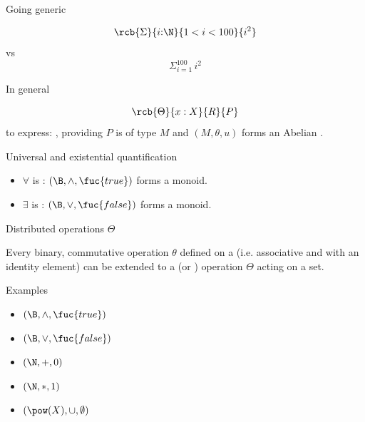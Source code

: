 \documentclass{beamer}
\def\true{\fuc{true}}
\def\false{\fuc{false}}
\def\e{\mathbin{\wedge}}
\def\ou{\mathbin{\vee}}
\begin{document}
\begin{slide}{Going generic}

$$
\rcb{\Sigma}{i{:}\N}{1<i<100}{i^2}
$$
vs 
$$\Sigma_{i=1}^{100} \, i^2$$

\begin{block}{In general}

$$
\rcb{\Theta}{x:X}{R}{P}
$$
to express: , providing $P$ is of type $M$  and $(M,\theta,u)$  forms an Abelian  .
\end{block}
\end{slide}


\begin{slide}{Universal and existential quantification}

\begin{block}{}
\begin{itemize}
\item $\forall$ is : $(\B, \e, \true)$ forms a monoid.
\item $\exists$ is : $(\B, \ou, \false)$ forms a monoid.
\end{itemize}
\end{block}
\end{slide} 


\begin{slide}{Distributed operations $\Theta$}

Every binary, commutative operation $\theta$ defined on a  (i.e. associative and with an identity element) can be extended to a  (or ) operation $\Theta$ acting on a set.

 \begin{block}{Examples}
\begin{itemize}
\item $(\B, \e, \true)$ 
\item $(\B, \ou, \false)$ 
\item $(\N, +, 0)$
\item $(\N, *, 1)$
\item $(\pow(X), \cup, \emptyset)$
\end{itemize}
\end{block}
\end{slide} 
\end{document}
